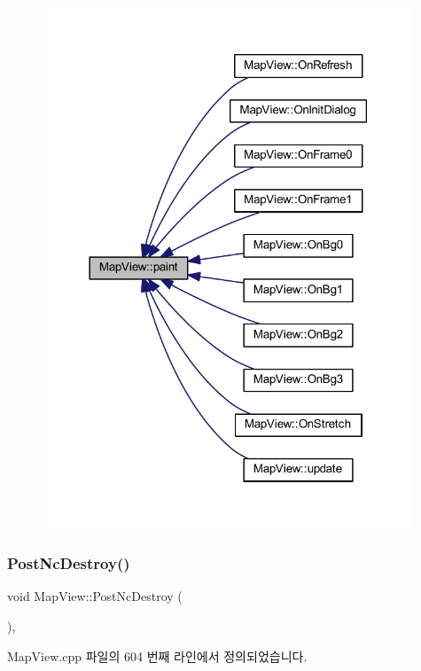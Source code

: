 \begin{figure}[H]
\begin{center}
\leavevmode
\includegraphics[width=314pt]{class_map_view_a89edf3053cffa4a68516178dbd987339_icgraph}
\end{center}
\end{figure}
\mbox{\label{class_map_view_a50910da172e0cd2a6e13fde5d5799906}} 
\subsubsection{\texorpdfstring{Post\+Nc\+Destroy()}{PostNcDestroy()}}
{\footnotesize\ttfamily void Map\+View\+::\+Post\+Nc\+Destroy (\begin{DoxyParamCaption}{ }\end{DoxyParamCaption})\hspace{0.3cm}{\ttfamily [protected]}, {\ttfamily [virtual]}}



Map\+View.\+cpp 파일의 604 번째 라인에서 정의되었습니다.


